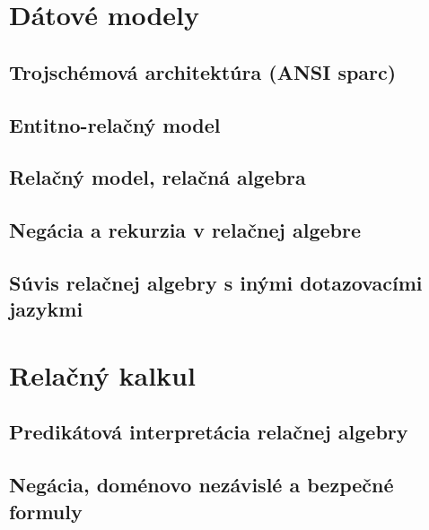 \documentclass[10pt,a4paper]{article}
\begin{document}
\section{Dátové modely}
\subsection{Trojschémová architektúra (ANSI sparc)}

\subsection{Entitno-relačný model}

\subsection{Relačný model, relačná algebra}

\subsection{Negácia a rekurzia v relačnej algebre}

\subsection{Súvis relačnej algebry s inými dotazovacími jazykmi}
    
\section{Relačný kalkul}

\subsection{Predikátová interpretácia relačnej algebry}

\subsection{Negácia, doménovo nezávislé a bezpečné formuly}
\end{document}
